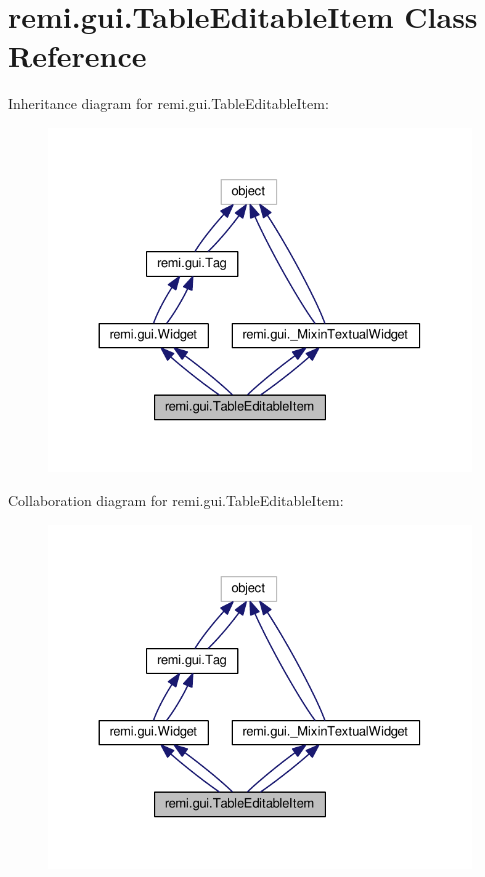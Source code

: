 \hypertarget{classremi_1_1gui_1_1TableEditableItem}{}\section{remi.\+gui.\+Table\+Editable\+Item Class Reference}
\label{classremi_1_1gui_1_1TableEditableItem}


Inheritance diagram for remi.\+gui.\+Table\+Editable\+Item\+:
\nopagebreak
\begin{figure}[H]
\begin{center}
\leavevmode
\includegraphics[width=330pt]{df/dab/classremi_1_1gui_1_1TableEditableItem__inherit__graph}
\end{center}
\end{figure}


Collaboration diagram for remi.\+gui.\+Table\+Editable\+Item\+:
\nopagebreak
\begin{figure}[H]
\begin{center}
\leavevmode
\includegraphics[width=330pt]{d5/dc5/classremi_1_1gui_1_1TableEditableItem__coll__graph}
\end{center}
\end{figure}
